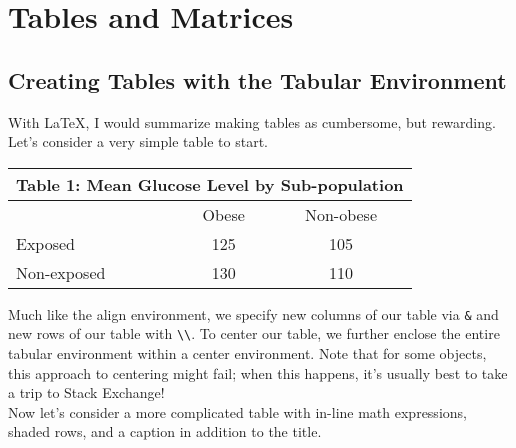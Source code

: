\documentclass[12pt]{article}	%
\begin{document}

\newpage
\section{Tables and Matrices}

\subsection{Creating Tables with the Tabular Environment}

With \LaTeX{}, I would summarize making tables as cumbersome, but rewarding. Let's consider a very simple table to start.

	\begin{center}
		\begin{tabular}{lcc}
			\multicolumn{3}{l}{Table 1: Mean Glucose Level by Sub-population}	\\ \hline \hline
						& Obese	& Non-obese						\\ \hline
			Exposed		& 125	& 105							\\
			Non-exposed	& 130	& 110							\\ \hline \hline
		\end{tabular}
	\end{center}

\noindent Much like the align environment, we specify new columns of our table via \verb!&! and new rows of our table with \verb!\\!. To center our table, we further enclose the entire tabular environment within a center environment. Note that for some objects, this approach to centering might fail; when this happens, it's usually best to take a trip to Stack Exchange! \\

Now let's consider a more complicated table with in-line math expressions, shaded rows, and a caption in addition to the title.
\end{document}
